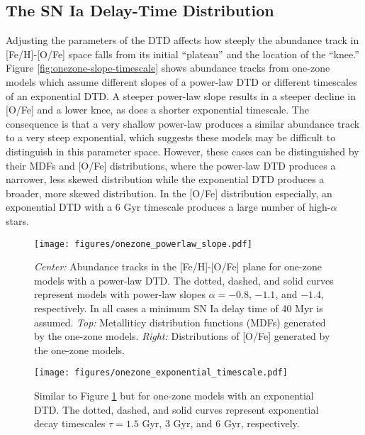 \documentclass[twocolumn,linenumbers,twocolappendix]{aastex631}
\begin{document}
\subsection{The SN Ia Delay-Time Distribution}

Adjusting the parameters of the DTD affects how steeply the abundance track in [Fe/H]-[O/Fe] space falls from its initial ``plateau'' and the location of the ``knee.'' Figure \ref{fig:onezone-slope-timescale} shows abundance tracks from one-zone models which assume different slopes of a power-law DTD or different timescales of an exponential DTD. A steeper power-law slope results in a steeper decline in [O/Fe] and a lower knee, as does a shorter exponential timescale. The consequence is that a very shallow power-law produces a similar abundance track to a very steep exponential, which suggests these models may be difficult to distinguish in this parameter space. However, these cases can be distinguished by their MDFs and [O/Fe] distributions, where the power-law DTD produces a narrower, less skewed distribution while the exponential DTD produces a broader, more skewed distribution. In the [O/Fe] distribution especially, an exponential DTD with a 6 Gyr timescale produces a large number of high-$\alpha$ stars.

\begin{figure}
    \centering
    \texttt{[image: figures/onezone\_powerlaw\_slope.pdf]}
    \caption{\textit{Center:} Abundance tracks in the [Fe/H]-[O/Fe] plane for one-zone models with a power-law DTD. The dotted, dashed, and solid curves represent models with power-law slopes $\alpha=-0.8$, $-1.1$, and $-1.4$, respectively. In all cases a minimum SN Ia delay time of 40 Myr is assumed. \textit{Top:} Metalliticy distribution functions (MDFs) generated by the one-zone models. \textit{Right:} Distributions of [O/Fe] generated by the one-zone models.}
    \label{fig:onezone-powerlaw-slope}
\end{figure}

\begin{figure}
    \centering
    \texttt{[image: figures/onezone\_exponential\_timescale.pdf]}
    \caption{Similar to Figure \ref{fig:onezone-powerlaw-slope} but for one-zone models with an exponential DTD. The dotted, dashed, and solid curves represent exponential decay timescales $\tau=1.5$ Gyr, 3 Gyr, and 6 Gyr, respectively.}
    \label{fig:onezone-exponential-timescale}
\end{figure}
\end{document}
